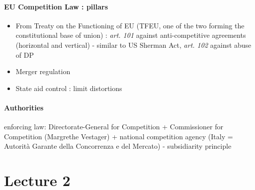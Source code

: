 \documentclass[10pt]{article}
\begin{document}
\paragraph{EU Competition Law : pillars} 
\begin{itemize}
\item From Treaty on the Functioning of EU (TFEU, one of the two forming the constitutional base of union) : \textit{art. 101} against anti-competitive agreements (horizontal and vertical) - similar to US Sherman Act, \textit{art. 102} against abuse of DP
\item Merger regulation
\item State aid control : limit distortions
\end{itemize}

\paragraph{Authorities} enforcing law: Directorate-General for Competition + Commissioner for Competition (Margrethe Vestager) + national competition agency (Italy = Autorità Garante della Concorrenza e del Mercato) - subsidiarity principle 

\section{Lecture 2}
\end{document}
